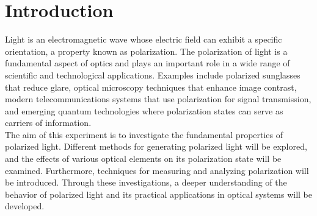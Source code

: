\section{Introduction}

Light is an electromagnetic wave whose electric field can exhibit a specific orientation, a property known as polarization. The polarization of light is a
fundamental aspect of optics and plays an important role in a wide range of scientific and technological applications. Examples include polarized sunglasses
that reduce glare, optical microscopy techniques that enhance image contrast, modern telecommunications systems that use polarization for signal transmission,
and emerging quantum technologies where polarization states can serve as carriers of information.
\\
The aim of this experiment is to investigate the fundamental properties of polarized light. Different methods for generating polarized light will be explored,
and the effects of various optical elements on its polarization state will be examined. Furthermore, techniques for measuring and analyzing polarization will 
be introduced. Through these investigations, a deeper understanding of the behavior of polarized light and its practical applications in optical systems will 
be developed.